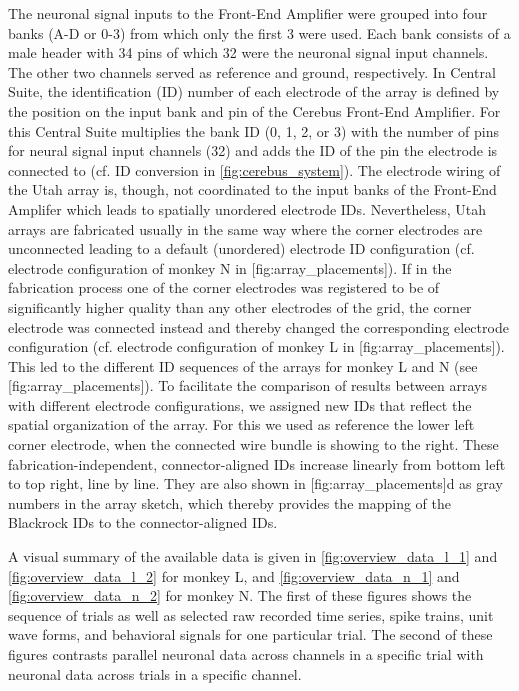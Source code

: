 {The neuronal signal inputs to the Front-End Amplifier were grouped into four banks (A-D or 0-3) from which only the first 3 were used. Each bank consists of a male header with 34 pins of which 32 were the neuronal signal input channels. The other two channels served as reference and ground, respectively. In Central Suite, the identification (ID) number of each electrode of the array is defined by the position on the input bank and pin of the Cerebus Front-End Amplifier. For this Central Suite multiplies the bank ID (0, 1, 2, or 3) with the number of pins for neural signal input channels (32) and adds the ID of the pin the electrode is connected to (cf. ID conversion in \cref{fig:cerebus_system}). The electrode wiring of the Utah array is, though, not coordinated to the input banks of the Front-End Amplifer which leads to spatially unordered electrode IDs. Nevertheless, Utah arrays are fabricated usually in the same way where the corner electrodes are unconnected leading to a default (unordered) electrode ID configuration (cf. electrode configuration of monkey N in [fig:array\_placements]). If in the fabrication process one of the corner electrodes was registered to be of significantly higher quality than any other electrodes of the grid, the corner electrode was connected instead and thereby changed the corresponding electrode configuration (cf. electrode configuration of monkey L in [fig:array\_placements]). This led to the different ID sequences of the arrays for monkey L and N (see [fig:array\_placements]). To facilitate the comparison of results between arrays with different electrode configurations, we assigned new IDs that reflect the spatial organization of the array. For this we used as reference the lower left corner electrode, when the connected wire bundle is showing to the right. These fabrication-independent, connector-aligned IDs increase linearly from bottom left to top right, line by line. They are also shown in [fig:array\_placements]d as gray numbers in the array sketch, which thereby provides the mapping of the Blackrock IDs to the connector-aligned IDs. 

A visual summary of the available data is given in \cref{fig:overview_data_l_1} and \cref{fig:overview_data_l_2}  for monkey L, and \cref{fig:overview_data_n_1} and \cref{fig:overview_data_n_2} for monkey N. The first of these figures shows the sequence of trials as well as selected raw recorded time series, spike trains, unit wave forms, and behavioral signals for one particular trial. The second of these figures contrasts parallel neuronal data across channels in a specific trial with neuronal data across trials in a specific channel.


}
